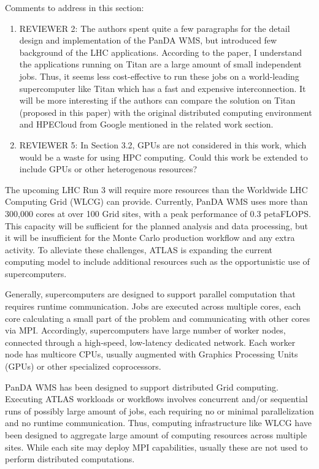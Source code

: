 Comments to address in this section:
\begin{enumerate}
	\item REVIEWER 2: The authors spent quite a few paragraphs for the detail
	design and implementation of the PanDA WMS, but introduced few background
	of the LHC applications. According to the paper, I understand the
	applications running on Titan are a large amount of small independent
	jobs. Thus, it seems less cost-effective to run these jobs on a
	world-leading supercomputer like Titan which has a fast and expensive
	interconnection. It will be more interesting if the authors can compare
	the solution on Titan (proposed in this paper) with the original
	distributed computing environment and HPECloud from Google mentioned in
	the related work section.
	\item REVIEWER 5: In Section 3.2, GPUs are not considered in this work,
	which would be a waste for using HPC computing. Could this work be
	extended to include GPUs or other heterogenous resources?
\end{enumerate}


The upcoming LHC Run 3 will require more resources than the Worldwide LHC
Computing Grid (WLCG) can provide. Currently, PanDA WMS uses more than
300,000 cores at over 100 Grid sites, with a peak performance of 0.3
petaFLOPS. This capacity will be sufficient for the planned analysis and data
processing, but it will be insufficient for the Monte Carlo production
workflow and any extra activity. To alleviate these challenges, ATLAS is
expanding the current computing model to include additional resources such as
the opportunistic use of supercomputers.

Generally, supercomputers are designed to support parallel computation that
requires runtime communication. Jobs are executed across multiple cores, each
core calculating a small part of the problem and communicating with other
cores via MPI. Accordingly, supercomputers have large number of worker nodes,
connected through a high-speed, low-latency dedicated network. Each worker
node has multicore CPUs, usually augmented with Graphics Processing Units
(GPUs) or other specialized coprocessors.

PanDA WMS has been designed to support distributed Grid computing. Executing
ATLAS workloads or workflows involves concurrent and/or sequential runs of
possibly large amount of jobs, each requiring no or minimal parallelization
and no runtime communication. Thus, computing infrastructure like WLCG have
been designed to aggregate large amount of computing resources across
multiple sites. While each site may deploy MPI capabilities, usually these
are not used to perform distributed computations.

